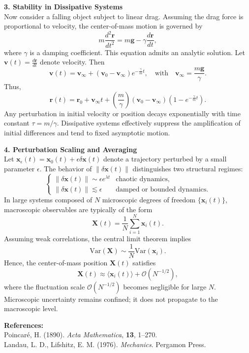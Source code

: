 \begin{technical}
\textbf{3. Stability in Dissipative Systems}\\[0.5em]
Now consider a falling object subject to linear drag. Assuming the drag force is proportional to velocity, the center-of-mass motion is governed by
\[
m \frac{d^2 \mathbf{r}}{dt^2} = m \mathbf{g} - \gamma \frac{d\mathbf{r}}{dt},
\]
where $\gamma$ is a damping coefficient. This equation admits an analytic solution. Let $\mathbf{v}(t) = \frac{d\mathbf{r}}{dt}$ denote velocity. Then
\[
\mathbf{v}(t) = \mathbf{v}_\infty + (\mathbf{v}_0 - \mathbf{v}_\infty) e^{-\frac{\gamma}{m} t}, \quad \text{with} \quad \mathbf{v}_\infty = \frac{m \mathbf{g}}{\gamma}.
\]
Thus,
\[
\mathbf{r}(t) = \mathbf{r}_0 + \mathbf{v}_\infty t + \left( \frac{m}{\gamma} \right) (\mathbf{v}_0 - \mathbf{v}_\infty) \left( 1 - e^{-\frac{\gamma}{m} t} \right).
\]
Any perturbation in initial velocity or position decays exponentially with time constant $\tau = m/\gamma$. Dissipative systems effectively suppress the amplification of initial differences and tend to fixed asymptotic motion.

\textbf{4. Perturbation Scaling and Averaging}\\[0.5em]
Let $\mathbf{x}_\epsilon(t) = \mathbf{x}_0(t) + \epsilon \delta \mathbf{x}(t)$ denote a trajectory perturbed by a small parameter $\epsilon$. The behavior of $\|\delta \mathbf{x}(t)\|$ distinguishes two structural regimes:
\[
\begin{cases}
\|\delta \mathbf{x}(t)\| \sim \epsilon e^{\lambda t} & \text{chaotic dynamics,} \\[0.5em]
\|\delta \mathbf{x}(t)\| \lesssim \epsilon & \text{damped or bounded dynamics.}
\end{cases}
\]
In large systems composed of $N$ microscopic degrees of freedom $\{\mathbf{x}_i(t)\}$, macroscopic observables are typically of the form
\[
\mathbf{X}(t) = \frac{1}{N} \sum_{i=1}^N \mathbf{x}_i(t).
\]
Assuming weak correlations, the central limit theorem implies
\[
\mathrm{Var}(\mathbf{X}) \sim \frac{1}{N} \mathrm{Var}(\mathbf{x}_i).
\]
Hence, the center-of-mass position $\mathbf{X}(t)$ satisfies
\[
\mathbf{X}(t) \approx \langle \mathbf{x}_i(t) \rangle + \mathcal{O}(N^{-1/2}),
\]
where the fluctuation scale $\mathcal{O}(N^{-1/2})$ becomes negligible for large $N$. Microscopic uncertainty remains confined; it does not propagate to the macroscopic level.

\vspace{0.5em}
\textbf{References:}\\
Poincaré, H. (1890). \emph{Acta Mathematica}, \textbf{13}, 1–270.\\
Landau, L. D., Lifshitz, E. M. (1976). \emph{Mechanics}. Pergamon Press.
\end{technical}

